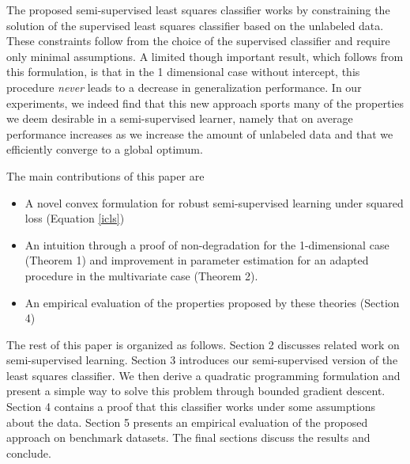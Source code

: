 \documentclass[smallcondensed]{svjour3}
\begin{document}
The proposed semi-supervised least squares classifier works by constraining the solution of the supervised least squares classifier based on the unlabeled data. These constraints follow from the choice of the supervised classifier and require only minimal assumptions. A limited though important result, which follows from this formulation, is that in the 1 dimensional case without intercept, this procedure \emph{never} leads to a decrease in generalization performance. In our experiments, we indeed find that this new approach sports many of the properties we deem desirable in a semi-supervised learner, namely that on average performance increases as we increase the amount of unlabeled data and that we efficiently converge to a global optimum.

The main contributions of this paper are

\begin{itemize}
  \item A novel convex formulation for robust semi-supervised learning under squared loss (Equation \ref{icls})
  \item An intuition through a proof of non-degradation for the 1-dimensional case (Theorem 1) and improvement in parameter estimation for an adapted procedure in the multivariate case (Theorem 2).
  \item An empirical evaluation of the properties proposed by these theories (Section 4)
\end{itemize}

The rest of this paper is organized as follows. Section 2 discusses related work on semi-supervised learning. Section 3 introduces our semi-supervised version of the least squares classifier. We then derive a quadratic programming formulation and present a simple way to solve this problem through bounded gradient descent. Section 4 contains a proof that this classifier works under some assumptions about the data. Section 5 presents an empirical evaluation of the proposed approach on benchmark datasets. The final sections discuss the results and conclude.
\end{document}
